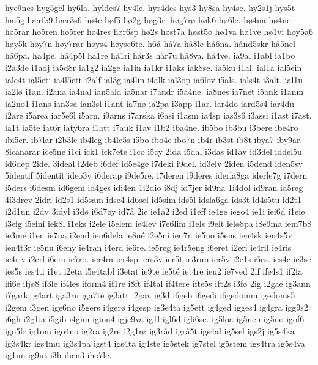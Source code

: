 {hye9nes
hyg5gel
hy6la.
hyldes7
hy4le.
hyr4des
hys3
hy8sa
hy4se.
hy2s1j
hys5t
h^^e65g
h^^e6rf^^f89
h^^e6r3s6
h^^f84e
h^^f8f5
h^^f82g
h^^f8g3ri
h^^f8g7r^^f8
h^^f8k6
h^^f86le.
h^^f84na
h^^f84ne.
h^^f85rar
h^^f85ren
h^^f85rer
h^^f84res
h^^f8r6sp
h^^f82s
h^^f8st7a
h^^f8st5^^f8
h^^f81va
h^^f81ve
h^^f81vi
h^^f8y5a6
h^^f8y5k
h^^f8y7n
h^^f8y7rar
h^^f8ys4
h^^f8yse6te.
h6^^e5
h^^e57a
h^^e58le
h^^e56na.
h^^e5nd5skr
h^^e55nel
h^^e56pa.
h^^e54pe.
h^^e54p5l
h^^e51re
h^^e51ri
h^^e5r3s
h^^e5r7u
h^^e58va.
h^^e54ve.
ia9al
i1abl
ia1bo
i2a3de
i1adj
ia5d8r
ia1g2
ia2ge
ia1in
ia1kr
i1aks
iak8se.
ia5ku
i1al.
ial1a
ial5ein
iale4t
ial5eti
ia4l5ett
i2alf
ial3g
ia4lin
i4alk
ial3op
ia6lov
i5als.
ials4t
i3alt.
ial1u
ia2l^^f8
i1an.
i2ana
ia4nal
ian5ald
ia5nar
i7andr
i5a4ne.
ia8nes
ia7net
i5ank
i1anm
ia2no1
i1ans
ian3sa
ian3sl
i1ant
ia7n^^f8
ia2pa
i3app
i1ar.
iar4do
iard5s4
iar4du
i2are
i5area
iar5e6l
i5arn.
i9arns
i7arska
i6asi
i1asm
ia4sp
ias3s6
i3assi
i1ast
i7ast.
ia1t
ia5te
iat6r
iaty6ra
i1att
i7auk
i1av
i1b2
iba4ne.
ib5bo
ib3bu
i3bere
ibe4ro
ibi5er.
ib7lar
i2b3le
ib4leg
ib4le5s
i5bo
ibo4e
ibo7n
ib4r
ib3st
ib8t
ibya7
iby9ar.
8icanarar
ice5ne
i1ci
ick1
ick7ete
i1co
i5cy
2ida
i5dal
i3das
id1av
id3del
iddel5u
id6dep
2ide.
3ideal
i2deb
i6def
id5e4ge
i7deki
i9del.
id3elv
2iden
i5dend
iden5sv
5identif
5identit
ideo3v
i6derap
i9de5re.
i7deren
i9deres
iderla8ga
iderle7g
i7dern
i5ders
i6desm
id6gem
id4ges
idi4en
1i2dio
i8dj
id7jer
id9na
1i4dol
id9ran
id5reg
4i3drev
2idri
id2s1
id5sam
idse4
id6sel
id5sim
ids5l
idsla6ga
ids3t
id4s5tu
id2t1
i2d1un
i2dy
3idyl
i3d^^f8
i6d7^^f8y
id7^^e5
2ie
ie1a2
i2ed
i1eff
ie4ge
iego4
ie1i
iei6d
i1eie
i3eig
i5eini
iek8l
i1eks
i2ele
i5elem
ie4lev
i7e6lim
i1els
i9elt
iel^^f88pa
i8e9ma
iem7b8
ie3me
i1en
ie7na
i2end
ien6dela
ie8n^^e9
i2e5ni
ien7n
ie5no
i5ens
ien4sk
ien4s5v
ien4t3r
ie5nu
i6eny
ie4ran
i4erd
ie6re.
ie5reg
ie4r5eng
i6eret
i2eri
ie4ril
ie4ris
ie4riv
i2erl
i6ero
ie7ro.
ier4ra
ier4sp
iers3v
ier5t
ie3run
ier5v
i2e1s
i6es.
ies4c
ie3se
ies5s
ies4ti
i1et
i2eta
i5e4tabl
i3etat
ie9te
ie5t^^e9
iet4re
ieu2
ie7ved
2if
ife4s1
if2fa
ifi6e
ifj^^f88
if3le
if4les
iform4
if1re
i8ft
if4tal
if4tere
ifte5s
ift2s
i3f^^f8
2ig
i2gae
ig3ann
i7gark
ig4art
iga3ru
iga7te
ig3att
i2gav
ig3d
i6geb
i6gedi
i6gedomm
igedoms5
i2gem
i3gen
ige6no
i5gers
i4ger^^f8
i4gesp
ig3e4ta
ig5ett
ig4ged
igges4
ig4gra
igg9s2
i6gh
i2g1ia
i5gib
i4gim
igion4
igje9va
ig1l
igl6d
igli6se.
ig5loa
ig5neu
ig5no
igof6
igo5fr 
ig1om
igo4no
ig2ra
ig2re
i2g1r^^f8
ig3r^^e5d
igr^^e55t
igs4al
ig5sel
igs2j
ig5s4ka
ig3s4kr
igs4mu
ig3s4pa
igst4
igs4ta
ig4ste
ig5stek
ig7stel
ig5stem
igs4tra
ig5s4va
ig1un
ig9ut
i3h
ihen3
iho7le.
}
